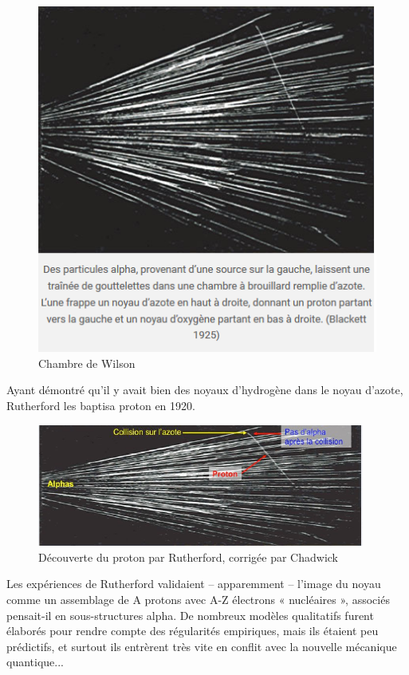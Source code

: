      \begin{figure}[ht]
        \centering
        \includegraphics[scale=0.75]{Images1/wilson.PNG}
        \caption{Chambre de Wilson}
    \end{figure}
    
     Ayant démontré qu’il y avait bien des noyaux d’hydrogène dans le noyau d’azote, Rutherford les baptisa proton en 1920. 
     
    \begin{figure}[ht]
        \centering
        \includegraphics[scale=0.80]{Images1/proton.PNG}
        \caption{Découverte du proton par Rutherford, corrigée par Chadwick}
    \end{figure}
     
     Les expériences de Rutherford validaient – apparemment – l’image du noyau comme un assemblage de A protons avec A-Z électrons « nucléaires », associés pensait-il en sous-structures alpha. De nombreux modèles qualitatifs furent élaborés pour rendre compte des régularités empiriques, mais ils étaient peu prédictifs, et surtout ils entrèrent très vite en conflit avec la nouvelle mécanique quantique...


